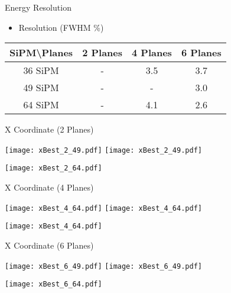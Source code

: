 \documentclass{beamer}
\begin{document}
\begin{frame}{Energy Resolution}
\begin{center}
\begin{itemize}
\item Resolution (FWHM \%)
\vspace{0.5 cm}
\end{itemize}
 \begin{tabular}{c|ccc|}
  \toprule
  SiPM\textbackslash Planes & \textbf{2 Planes} & \textbf{4 Planes} & \textbf{6 Planes} \\
   \hline
  36 SiPM & - & 3.5 & 3.7 \\
  49 SiPM & - & - & 3.0 \\
  64 SiPM & - & 4.1 & 2.6 \\
    \toprule
 \end{tabular}
\end{center}
\end{frame}

\begin{frame}{X Coordinate (2 Planes)}
\begin{adjustwidth}{-1.5em}{-1.5em}
	\texttt{[image: xBest\_2\_49.pdf]}
	\texttt{[image: xBest\_2\_49.pdf]} \\
	\begin{center} {\texttt{[image: xBest\_2\_64.pdf]}} \end{center}
\end{adjustwidth}
\end{frame}

\begin{frame}{X Coordinate (4 Planes)}
\begin{adjustwidth}{-1.5em}{-1.5em}
	\texttt{[image: xBest\_4\_64.pdf]}
	\texttt{[image: xBest\_4\_64.pdf]} \\
	\begin{center} {\texttt{[image: xBest\_4\_64.pdf]}} \end{center}
\end{adjustwidth}
\end{frame}

\begin{frame}{X Coordinate (6 Planes)}
\begin{adjustwidth}{-1.5em}{-1.5em}
	\texttt{[image: xBest\_6\_49.pdf]}
	\texttt{[image: xBest\_6\_49.pdf]} \\
	\begin{center} {\texttt{[image: xBest\_6\_64.pdf]}} \end{center}
\end{adjustwidth}
\end{frame}
\end{document}
